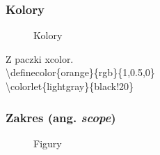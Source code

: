 \documentclass[10pt,t]{beamer}
\begin{document}
\begin{frame}
  \frametitle{Kolory}




  \begin{figure}

    \centering

    \begin{tikzpicture}









    \end{tikzpicture}


    \caption{Kolory}

  \end{figure}


  Z paczki xcolor. \\
  \textbackslash definecolor\{orange\}\{rgb\}\{1,0.5,0\} \\
  \textbackslash colorlet\{lightgray\}\{black!20\}

\end{frame}





\begin{frame}
  \frametitle{Zakres (ang. \textit{scope})}


  \begin{figure}

    \centering



    \caption{Figury}

  \end{figure}

\end{frame}
\end{document}

